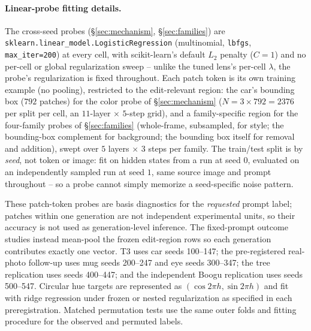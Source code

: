 \documentclass[10pt,twocolumn,letterpaper]{article}
\begin{document}
\paragraph{Linear-probe fitting details.} The cross-seed probes
(\S\ref{sec:mechanism}, \S\ref{sec:families}) are
\texttt{sklearn.linear\_model.LogisticRegression} (multinomial,
\texttt{lbfgs}, \texttt{max\_iter=200}) at every cell, with
scikit-learn's default $L_2$ penalty ($C{=}1$) and no per-cell or
global regularization sweep -- unlike the tuned lens's per-cell
$\lambda$, the probe's regularization is fixed throughout. Each patch
token is its own training example (no pooling), restricted to the
edit-relevant region: the car's bounding box ($792$ patches) for the
color probe of \S\ref{sec:mechanism} ($N{=}3{\times}792{=}2376$ per
split per cell, an $11$-layer $\times$ $5$-step grid), and a
family-specific region for the four-family probes of
\S\ref{sec:families} (whole-frame, subsampled, for style; the
bounding-box complement for background; the bounding box itself for
removal and addition), swept over $5$ layers $\times$ $3$ steps per
family. The train/test split is by \emph{seed}, not token or image: fit
on hidden states from a run at seed $0$, evaluated on an independently
sampled run at seed $1$, same source image and prompt throughout -- so
a probe cannot simply memorize a seed-specific noise pattern.

These patch-token probes are basis diagnostics for the \emph{requested}
prompt label; patches within one generation are not independent
experimental units, so their accuracy is not used as generation-level
inference. The fixed-prompt outcome studies instead mean-pool the frozen
edit-region rows so each generation contributes exactly one vector.
T3 uses car seeds 100--147; the pre-registered real-photo follow-up uses
mug seeds 200--247 and eye seeds 300--347; the tree replication uses
seeds 400--447; and the independent Boogu replication uses seeds
500--547. Circular hue targets are represented as
$(\cos 2\pi h,\sin 2\pi h)$ and fit with ridge regression under frozen
or nested regularization as specified in each preregistration. Matched
permutation tests use the same outer folds and fitting procedure for the
observed and permuted labels.
\end{document}
